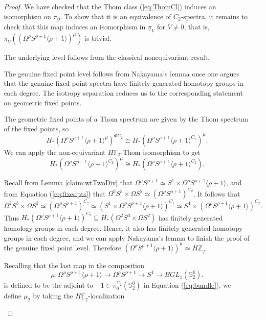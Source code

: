\documentclass[]{amsart}  %
\theoremstyle{definition}
\numberwithin{equation}{section}
\numberwithin{figure}{section}
\newcommand{\mF}{{\mathbb F}}
\newcommand{\mS}{{\mathbb S}}
\newcommand{\mZ}{{\mathbb Z}}
\newcommand{\umF}{\underline{\mF}}
\newcommand{\umZ}{\underline{\mZ}}
\newcommand{\0}{\langle 0 \rangle}
\begin{document}
\begin{proof}
    We have checked that the Thom class (\ref{eq:ThomCl}) induces an isomorphism on $\underline{\pi_0}$. To show that it is an equivalence of $C_2$-spectra, it remains to check that this map induces an isomorphism in $\underline{\pi}_V$ for $V \neq 0$, that is, $\underline{\pi}_V( (\Omega^\rho S^{\rho + 1} \langle \rho + 1 \rangle)^\mu)$ is trivial. 
    
    The underlying level follows from the classical nonequivariant result. 

    The genuine fixed point level follows from Nakayama's lemma once one argues that the genuine fixed point spectra have finitely generated homotopy groups in each degree. 
The isotropy separation reduces us to the corresponding statement on geometric fixed points.

The geometric fixed points of a Thom spectrum are given by the Thom spectrum of the fixed points, so
\[
H_* (\Omega^\rho S^{\rho + 1} \langle \rho + 1 \rangle^\mu)^{\Phi C_2} \cong H_*( \Omega^\rho S^{\rho + 1} \langle \rho + 1 \rangle^{C_2} )^\mu
.\]
We can apply the non-equivariant $H \mF_2$-Thom isomorphism to get
\[
H_*(\Omega^\rho S^{\rho + 1} \langle \rho + 1 \rangle^{C_2} )^\mu \cong H_* (\Omega^\rho S^{\rho + 1} \langle \rho + 1 \rangle^{C_2}).
\]

    Recall from Lemma \ref{claim:wtTwoDiv} that $\Omega^\rho S^{\rho + 1} \simeq S^1 \times \Omega^\rho S^{\rho + 1} \langle \rho + 1 \rangle$, and from Equation (\ref{eq:fixedpts}) that $\Omega^2 S^3 \times \Omega S^2 \simeq (\Omega^\rho S^{\rho + 1})^{C_2}$. It follows that 
    $$\Omega^2 S^3 \times \Omega S^2 \simeq (\Omega^\rho S^{\rho + 1})^{C_2} \simeq (S^1 \times \Omega^\rho S^{\rho + 1} \langle \rho + 1 \rangle) ^{C_2} \simeq S^1 \times (\Omega^\rho S^{\rho + 1} \langle \rho + 1 \rangle)^{C_2}.$$
    Thus $H_* (\Omega^\rho S^{\rho + 1} \langle \rho + 1 \rangle)^{C_2} \subseteq H_* (\Omega^2 S^3 \times \Omega S^2)$ has finitely generated homology groups in each degree. Hence, it also has finitely generated homotopy groups in each degree, and we can apply Nakayama's lemma to finish the proof of the genuine fixed point level. Therefore $(\Omega^\rho S^{\rho + 1} \langle \rho + 1 \rangle)^\mu \simeq H \umZ_2$. 



Recalling that the last map in the composition 
\[
\mu: \Omega^\rho S^{\rho + 1} \langle \rho + 1 \rangle \to \Omega^\rho S^{\rho + 1}\to S^1 \to BGL_1(\mS_2^0).
\]
is defined to be the adjoint to $-1 \in \pi_0^{C_2} (\mS_2^0)$ in Equation (\ref{eq:bundle}),
we define $\mu_2$ by taking the $H \umF_2$-localization
\begin{center}
\end{center}


\end{proof}
\end{document}
